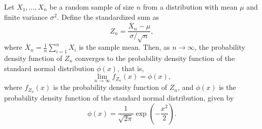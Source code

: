 \begin{theorem}
\label{th:central_limit_theorem_pdf}
Let $X_{1}, \ldots, X_{n}$ be a random sample of size $n$ from a distribution with mean $\mu$ and finite variance $\sigma^{2}$. Define the standardized sum as
\[
Z_n = \frac{\overline{X}_{n}-\mu}{\sigma/\sqrt{n}},
\]
where $\overline{X}_{n} = \frac{1}{n} \sum_{i=1}^{n} X_i$ is the sample mean. Then, as $n \rightarrow \infty$, the probability density function of $Z_n$ converges to the probability density function of the standard normal distribution $\phi(x)$, that is,
\[
\lim_{n \rightarrow \infty} f_{Z_n}(x) = \phi(x),
\]
where $f_{Z_n}(x)$ is the probability density function of $Z_n$, and $\phi(x)$ is the probability density function of the standard normal distribution, given by
\[
\phi(x) = \frac{1}{\sqrt{2\pi}} \exp\left(-\frac{x^2}{2}\right).
\]
\end{theorem}
